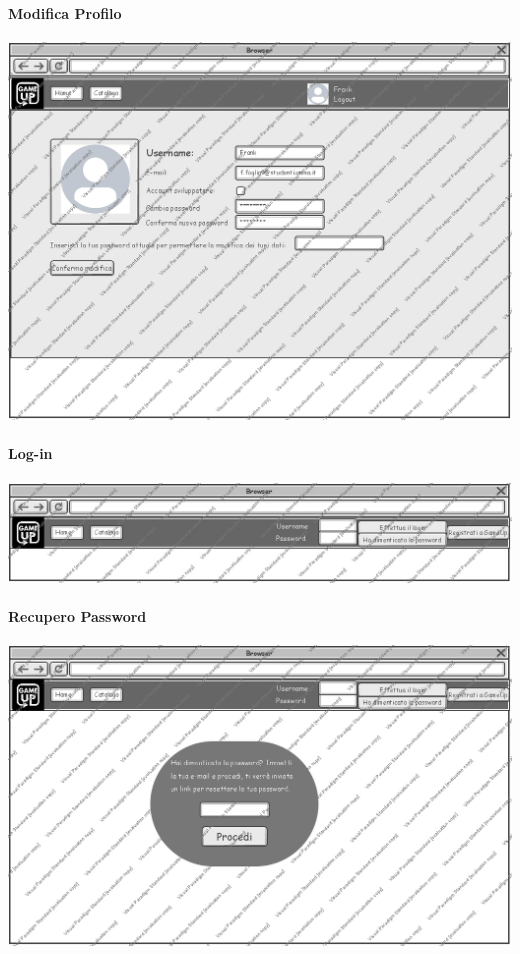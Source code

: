 \newpage
\paragraph{Modifica Profilo}
\begin{center}
\includegraphics[width=\textwidth,height=\textheight,keepaspectratio]{Figure/Mockups/ModificaProfilo.jpg}
\end{center}

\newpage
\paragraph{Log-in}
\begin{center}
\includegraphics[width=\textwidth,height=\textheight,keepaspectratio]{Figure/Mockups/Login.jpg}
\end{center}

\newpage
\paragraph{Recupero Password}
\begin{center}
\includegraphics[width=\textwidth,height=\textheight,keepaspectratio]{Figure/Mockups/RecuperoPassword1.jpg}
\end{center}

